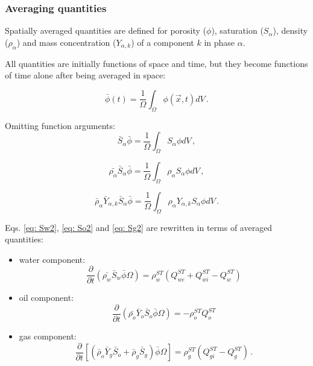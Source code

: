 \documentclass[authoryear,preprint,review,11pt]{elsarticle}
\begin{document}
\subsubsection{Averaging quantities}

Spatially averaged quantities are defined for porosity ($\phi$), saturation ($S_\alpha$), density ($\rho_\alpha$) and mass concentration ($Y_{\alpha,k}$) of a component $k$ in phase $\alpha$.

All quantities are initially functions of space and time, but they become functions of time alone after being averaged in space:

\begin{equation}
\bar{\phi} (t) = \frac{1}{\Omega}\int_{\Omega}\phi \left(\vec{x},t\right) dV \, .
\end{equation}

Omitting function arguments:
\begin{equation}
\bar{S}_\alpha\bar{\phi} = \frac{1}{\Omega}\int_{\Omega}S_\alpha \phi dV \, ,
\end{equation}

\begin{equation}
\bar{\rho_\alpha}\bar{S}_\alpha \bar{\phi} = \frac{1}{\Omega}\int_{\Omega}\rho_\alpha S_\alpha \phi dV \, ,
\end{equation}

\begin{equation}
\bar{\rho}_\alpha \bar{Y}_{\alpha,k}\bar{S}_\alpha \bar{\phi} = \frac{1}{\Omega}\int_{\Omega}\rho_\alpha Y_{\alpha,k} S_\alpha \phi dV \, .
\end{equation}

Eqs. \eqref{eq: Sw2}, \eqref{eq: So2} and \eqref{eq: Sg2} are rewritten in terms of averaged quantities:

\begin{itemize}
\item water component:
\begin{equation}\label{eq: Sw3}
\frac{\partial}{\partial t} \left( \bar{\rho_w}\bar{S}_w\bar{\phi} \Omega \right) = \rho_w^{ST}\left(Q_{we}^{ST} + Q_{wi}^{ST}-Q_w^{ST}\right)
\end{equation}

\item oil component:
\begin{equation}\label{eq: So3}
\frac{\partial}{\partial t} \left( \bar{\rho_o}\bar{Y}_o\bar{S}_o\bar{\phi} \Omega \right) = - \rho_o^{ST}Q_o^{ST}
\end{equation}

\item gas component:
\begin{equation}\label{eq: Sg3}
\frac{\partial}{\partial t} \left[\left( \bar{\rho}_o\bar{Y}_g \bar{S}_o + \bar{\rho}_g \bar{S}_g \right) \bar{\phi} \Omega\right] =  \rho_g^{ST}(Q_{gi}^{ST}-Q_g^{ST}) \, .
\end{equation}
\end{itemize}
\end{document}
